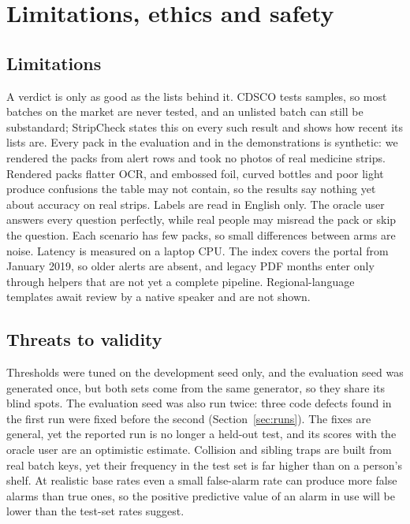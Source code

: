\section{Limitations, ethics and safety}
\label{sec:limits}

\subsection{Limitations}
A \NLISTED{} verdict is only as good as the lists behind it. CDSCO tests samples, so most batches on the market are never tested, and an unlisted batch can still be substandard; StripCheck states this on every such result and shows how recent its lists are. Every pack in the evaluation and in the demonstrations is synthetic: we rendered the packs from alert rows and took no photos of real medicine strips. Rendered packs flatter OCR, and embossed foil, curved bottles and poor light produce confusions the table may not contain, so the results say nothing yet about accuracy on real strips. Labels are read in English only. The oracle user answers every question perfectly, while real people may misread the pack or skip the question. Each scenario has few packs, so small differences between arms are noise. Latency is measured on a laptop CPU. The index covers the portal from January 2019, so older alerts are absent, and legacy PDF months enter only through helpers that are not yet a complete pipeline. Regional-language templates await review by a native speaker and are not shown.

\subsection{Threats to validity}
Thresholds were tuned on the development seed only, and the evaluation seed was generated once, but both sets come from the same generator, so they share its blind spots. The evaluation seed was also run twice: three code defects found in the first run were fixed before the second (Section~\ref{sec:runs}). The fixes are general, yet the reported run is no longer a held-out test, and its scores with the oracle user are an optimistic estimate. Collision and sibling traps are built from real batch keys, yet their frequency in the test set is far higher than on a person's shelf. At realistic base rates even a small false-alarm rate can produce more false alarms than true ones, so the positive predictive value of an alarm in use will be lower than the test-set rates suggest.

